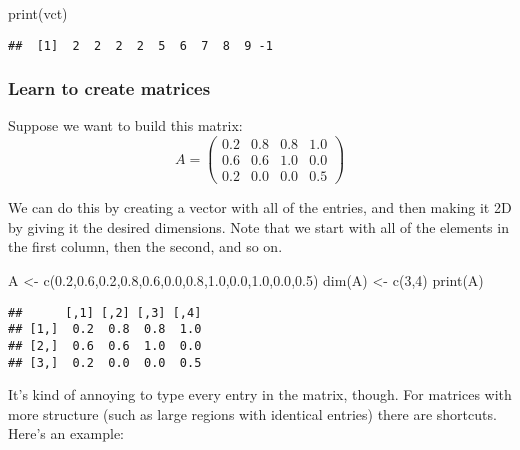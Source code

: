 \documentclass[
]{article}
\newenvironment{Shaded}{\begin{snugshade}}{\end{snugshade}}
\newcommand{\DecValTok}[1]{\textcolor[rgb]{0.00,0.00,0.81}{#1}}
\newcommand{\FloatTok}[1]{\textcolor[rgb]{0.00,0.00,0.81}{#1}}
\newcommand{\FunctionTok}[1]{\textcolor[rgb]{0.00,0.00,0.00}{#1}}
\newcommand{\NormalTok}[1]{#1}
\newcommand{\OtherTok}[1]{\textcolor[rgb]{0.56,0.35,0.01}{#1}}
\begin{document}
\begin{Shaded}
\begin{Highlighting}[]
\FunctionTok{print}\NormalTok{(vct)}
\end{Highlighting}
\end{Shaded}

\begin{verbatim}
##  [1]  2  2  2  2  5  6  7  8  9 -1
\end{verbatim}

\hypertarget{learn-to-create-matrices}{%
\subsubsection{Learn to create
matrices}\label{learn-to-create-matrices}}

Suppose we want to build this matrix: \[ A = \begin{pmatrix}
0.2&0.8&0.8&1.0\\
0.6&0.6&1.0&0.0\\
0.2&0.0&0.0&0.5
\end{pmatrix}\]

We can do this by creating a vector with all of the entries, and then
making it 2D by giving it the desired dimensions. Note that we start
with all of the elements in the first column, then the second, and so
on.

\begin{Shaded}
\begin{Highlighting}[]
\NormalTok{A }\OtherTok{\textless{}{-}} \FunctionTok{c}\NormalTok{(}\FloatTok{0.2}\NormalTok{,}\FloatTok{0.6}\NormalTok{,}\FloatTok{0.2}\NormalTok{,}\FloatTok{0.8}\NormalTok{,}\FloatTok{0.6}\NormalTok{,}\FloatTok{0.0}\NormalTok{,}\FloatTok{0.8}\NormalTok{,}\FloatTok{1.0}\NormalTok{,}\FloatTok{0.0}\NormalTok{,}\FloatTok{1.0}\NormalTok{,}\FloatTok{0.0}\NormalTok{,}\FloatTok{0.5}\NormalTok{)}
\FunctionTok{dim}\NormalTok{(A) }\OtherTok{\textless{}{-}} \FunctionTok{c}\NormalTok{(}\DecValTok{3}\NormalTok{,}\DecValTok{4}\NormalTok{)}
\FunctionTok{print}\NormalTok{(A)}
\end{Highlighting}
\end{Shaded}

\begin{verbatim}
##      [,1] [,2] [,3] [,4]
## [1,]  0.2  0.8  0.8  1.0
## [2,]  0.6  0.6  1.0  0.0
## [3,]  0.2  0.0  0.0  0.5
\end{verbatim}

It's kind of annoying to type every entry in the matrix, though. For
matrices with more structure (such as large regions with identical
entries) there are shortcuts. Here's an example:
\end{document}
